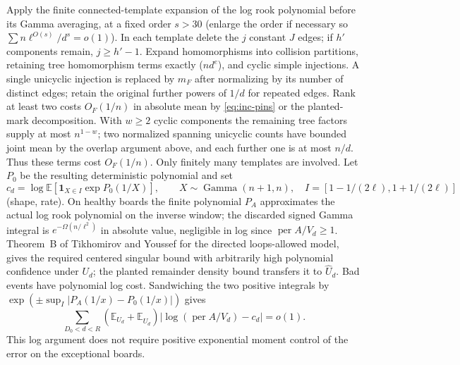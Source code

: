 Apply the finite connected-template expansion of the log rook polynomial
before its Gamma averaging, at a fixed order $s>30$ (enlarge the order
if necessary so $\sum n\ell^{O(s)}/d^s=o(1)$). In each template delete
the $j$ constant $J$ edges; if $h'$ components remain, $j\ge h'-1$.
Expand homomorphisms into collision partitions, retaining tree
homomorphism terms exactly ($nd^e$), and cyclic simple injections.
A single unicyclic injection is replaced by $m_F$ after normalizing
by its number of distinct edges; retain the original further powers
of $1/d$ for repeated edges. Rank at least two costs $O_F(1/n)$ in
absolute mean by \eqref{eq:inc-pins} or the planted-mark decomposition. With $w\ge2$
cyclic components the remaining tree factors supply at most $n^{1-w}$;
two normalized spanning unicyclic counts have bounded joint mean
by the overlap argument above, and each further one is at most $n/d$.
Thus these terms cost $O_F(1/n)$. Only finitely many templates are
involved. Let $P_0$ be the resulting deterministic polynomial and set
\[
 c_d=\log\mathbb E[\mathbf1_{X\in I}\exp P_0(1/X)],\qquad
 X\sim\operatorname{Gamma}(n+1,n),\quad I=[1-1/(2\ell),1+1/(2\ell)]
\]
(shape, rate). On healthy boards the finite polynomial $P_A$ approximates
the actual log rook polynomial on the inverse window; the discarded
signed Gamma integral is $e^{-\Omega(n/\ell^2)}$ in absolute value,
negligible in log since $\operatorname{per}A/V_d\ge1$.
Theorem~B of Tikhomirov and Youssef \cite{TY} for the directed
loops-allowed model, gives the required centered singular bound with
arbitrarily high polynomial confidence under $U_d$; the planted
remainder density bound transfers it to $\widehat U_d$. Bad events have
polynomial log cost. Sandwiching the two positive integrals by
$\exp(\pm\sup_I|P_A(1/x)-P_0(1/x)|)$ gives
\[
 \sum_{D_0<d<R}(\mathbb E_{U_d}+\mathbb E_{\widehat U_d})
     |\log(\operatorname{per}A/V_d)-c_d|=o(1).\tag{I2}\label{eq:inc-common}
\]
This log argument does not require positive exponential moment control
of the error on the exceptional boards.


